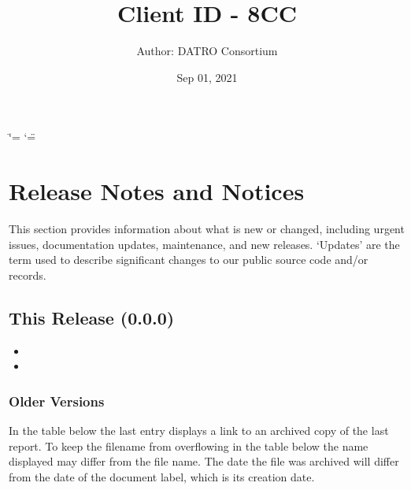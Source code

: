 \documentclass[letterpaper,10pt,openany,oneside,english]{sphinxmanual}
\title{Client ID - 8CC}
\date{Sep 01, 2021}
\author{Author: DATRO Consortium}
\begin{document}
\ifdefined\shorthandoff
  \ifnum\catcode`\=\string=\active\shorthandoff{=}\fi
  \ifnum\catcode`\"=\active{}\fi
\fi

\pagestyle{empty}
\sphinxmaketitle
\pagestyle{plain}
\sphinxtableofcontents
\pagestyle{normal}
\label{\detokenize{index::doc}}



\chapter{Release Notes and Notices}
\label{\detokenize{releasenotes:release-notes-and-notices}}\label{\detokenize{releasenotes::doc}}
\sphinxAtStartPar
This section provides information about what is new or changed, including urgent issues, documentation updates, maintenance, and new releases.
\sphinxhyphen{} ‘Updates’ are the term used to describe significant changes to our public source code and/or records.


\section{This Release (0.0.0)}
\label{\detokenize{releasenotes:this-release-0-0-0}}\begin{itemize}
\item {} 
\sphinxAtStartPar
{} \sphinxhyphen{} 

\item {} 
\sphinxAtStartPar
{} \sphinxhyphen{} 

\end{itemize}


\subsection{Older Versions}
\label{\detokenize{releasenotes:older-versions}}
\sphinxAtStartPar
In the table below the last entry displays a link to an archived copy of the last report.
To keep the filename from overflowing in the table below the name displayed may differ from the file name.
The date the file was archived will differ from the date of the document label, which is its creation date.
\end{document}

